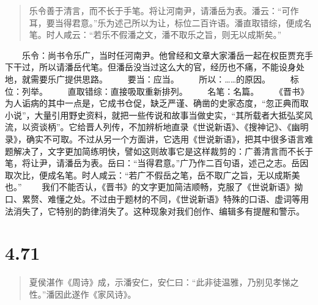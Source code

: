 \documentclass[]{book}
\begin{document}
\begin{quote}
乐令善于清言，而不长于手笔。将让河南尹，请潘岳为表。潘云：``可作耳，要当得君意。''乐为述己所以为让，标位二百许语。潘直取错综，便成名笔。时人咸云：``若乐不假潘之文，潘不取乐之旨，则无以成斯矣。''
\end{quote}

　　乐令：尚书令乐广，当时任河南尹。他曾经和文章大家潘岳一起在权臣贾充手下干过，所以请潘岳代笔。但潘岳没当过这么大的官，经历也不痛，不能设身处地，就需要乐广提供思路。
　　要当：应当。 　　所以：\ldots{}\ldots{}的原因。 　　标位：列举。
　　直取错综：直接吸取重新排列。 　　名笔：名篇。
　　《晋书》为人诟病的其中一点是，它成书仓促，缺乏严谨、确凿的史家态度，``忽正典而取小说''，大量引用野史资料，就把一些传说和故事当做史实，``其所载者大抵弘奖风流，以资谈柄''。它给晋人列传，不加辨析地直录《世说新语》、《搜神记》、《幽明录》，确实不可取。不过从另一个方面讲，它选用《世说新语》，把其中很多语言难题解决了，文字更加简练明快，譬如这则故事它是这样裁剪的：广善清言而不长于笔，将让尹，请潘岳为表。岳曰：``当得君意。''广乃作二百句语，述己之志。岳因取次比，便成名笔。时人咸云：``若广不假岳之笔，岳不取广之旨，无以成斯美也。''
　　我们不能否认，《晋书》的文字更加简洁顺畅，克服了《世说新语》拗口、累赘、难懂之处。不过由于题材的不同，《世说新语》特殊的口语、虚词等用法消失了，它特别的韵律消失了。这种现象对我们创作、编辑多有提醒和警示。

\section{4.71}\label{section-248}

\begin{quote}
夏侯湛作《周诗》成，示潘安仁，安仁曰：``此非徒温雅，乃别见孝悌之性。''潘因此遂作《家风诗》。
\end{quote}
\end{document}
